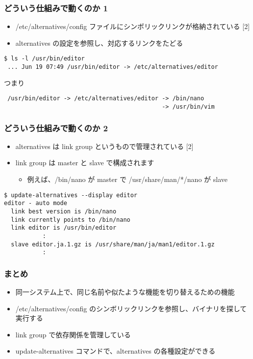 \documentclass[cjk,dvipdfmx,12pt,compress,%
hyperref={bookmarks=true,bookmarksnumbered=true,bookmarksopen=false,%
colorlinks=false,%
pdftitle={第 120 回 関西 Debian 勉強会},%
pdfauthor={倉敷・のがた・佐々木・かわだ・おおつき},%
pdfsubject={資料},%
}]{beamer}
\begin{document}
\begin{frame}[fragile]
  \frametitle{どういう仕組みで動くのか 1}
   \begin{itemize}
     \item /etc/alternatives/config ファイルにシンボリックリンクが格納されている [2]
     \item alternatives の設定を参照し、対応するリンクをたどる 
   \end{itemize}
\begin{tiny}
\begin{verbatim}
$ ls -l /usr/bin/editor
 ... Jun 19 07:49 /usr/bin/editor -> /etc/alternatives/editor
\end{verbatim}
\end{tiny}
つまり
\begin{tiny}
\begin{verbatim}
 /usr/bin/editor -> /etc/alternatives/editor -> /bin/nano
                                             -> /usr/bin/vim
\end{verbatim}
\end{tiny}
\end{frame}

\begin{frame}[fragile]
  \frametitle{どういう仕組みで動くのか 2}
   \begin{itemize}
     \item alternatives は link group というもので管理されている [2]
     \item link group は master と slave で構成されます
     \begin{itemize}
       \item 例えば、/bin/nano が master で /usr/share/man/*/nano が slave
     \end{itemize}
   \end{itemize}
\begin{tiny}
\begin{verbatim}
$ update-alternatives --display editor 
editor - auto mode
  link best version is /bin/nano
  link currently points to /bin/nano
  link editor is /usr/bin/editor
           :
  slave editor.ja.1.gz is /usr/share/man/ja/man1/editor.1.gz
           :
\end{verbatim}
\end{tiny}
\end{frame}


\begin{frame}[fragile]
  \frametitle{まとめ}
   \begin{itemize}
     \item 同一システム上で、同じ名前や似たような機能を切り替えるための機能
     \item /etc/alternatives/config のシンボリックリンクを参照し、バイナリを探して実行する
     \item link group で依存関係を管理している
     \item update-alternatives コマンドで、alternatives の各種設定ができる
   \end{itemize}
\end{frame}
\end{document}
